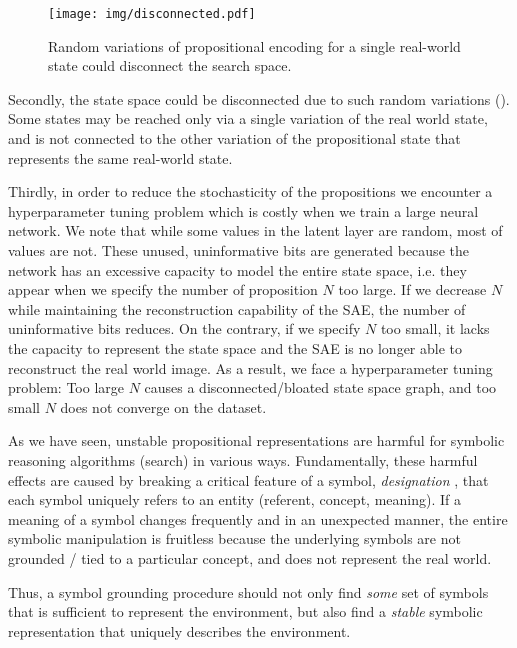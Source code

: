 \begin{figure}[htb]
 \centering
 \texttt{[image: img/disconnected.pdf]}
 \caption{Random variations of propositional encoding for a single real-world state could disconnect the search space.}
 \label{disconnected}
\end{figure}

Secondly, the state space could be disconnected due to such random variations ().
Some states may be reached only via a single variation of the real world state, and is not connected to the
other variation of the propositional state that represents the same real-world state.

Thirdly, in order to reduce the stochasticity of the propositions we encounter a hyperparameter tuning problem
which is costly when we train a large neural network.
We note that while some values in the latent layer are random, most of values are not.
These unused, uninformative bits are generated because the network has an excessive capacity to 
model the entire state space, i.e. they appear when we specify the number of proposition $N$ too large.
If we decrease $N$ while maintaining the reconstruction capability of the SAE, the number of uninformative bits
reduces.
On the contrary, if we specify $N$ too small, it lacks the capacity to represent the state space
and the SAE is no longer able to reconstruct the
real world image.
As a result, we face a hyperparameter tuning problem: Too large $N$ causes a disconnected/bloated state space graph,
and too small $N$ does not converge on the dataset.


As we have seen, unstable propositional representations are harmful for symbolic reasoning algorithms (search)
in various ways.
Fundamentally,
these harmful effects are caused by breaking a critical feature of a symbol, \emph{designation} \cite{newell1976computer,newell1980physical},
that each symbol uniquely refers to an entity (referent, concept, meaning).
If a meaning of a symbol changes frequently and in an unexpected manner, the entire symbolic manipulation is fruitless
because the underlying symbols are not grounded / tied to a particular concept, and does not represent the real world.

Thus, a symbol grounding procedure should not only find \emph{some} set of symbols that is sufficient to represent the
environment, but also find a \emph{stable} symbolic representation that uniquely describes the environment.


